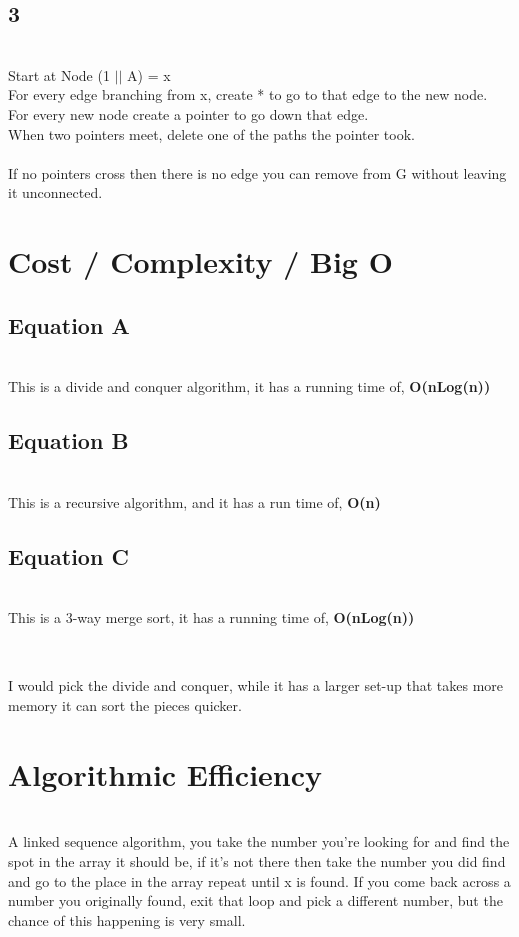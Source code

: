 \documentclass[12pt]{amsart}
\begin{document}
\subsection*{3}
\leavevmode
\\
Start at Node (1 $||$ A) = x \\
For every edge branching from x, create * to go to that edge to the new node. \\
For every new node create a pointer to go down that edge. \\
When two pointers meet, delete one of the paths the pointer took. \\
\\
If no pointers cross then there is no edge you can remove from G without leaving it unconnected.

\pagebreak
\section{Cost / Complexity  / Big O}
\subsection*{Equation A}
\leavevmode \\
This is a divide and conquer algorithm, it has a running time of, \textbf{O(nLog(n))}
\\
\subsection*{Equation B}
\leavevmode \\
This is a recursive algorithm, and it has a run time of, \textbf{O(n)}
\\
\subsection*{Equation C}
\leavevmode \\
This is a 3-way merge sort, it has a running time of, \textbf{O(nLog(n))}
\\
\subsection*{}
\leavevmode \\
I would pick the divide and conquer, while it has a larger set-up that takes more memory it can sort the pieces quicker.

\pagebreak

\section{Algorithmic Efficiency}
\leavevmode \\
A linked sequence algorithm,   you take the number you’re looking for and find the spot in the array it should be, if it’s not there then take the number you did find and go to the place in the array repeat until x is found.   If you come back across a number you originally found, exit that loop and pick a different number, but the chance of this happening is very small.
\end{document}
